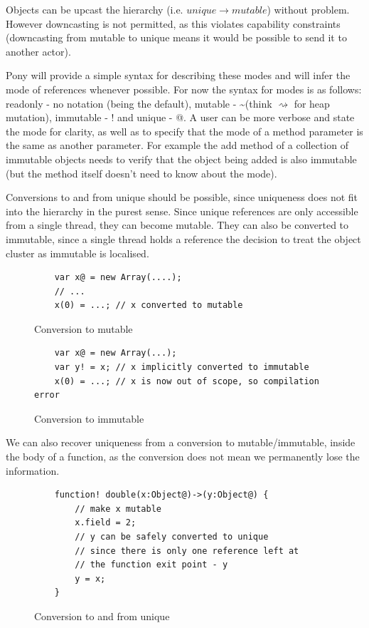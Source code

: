 \documentclass[pdftex,11pt,a4paper]{report}
\begin{document}
Objects can be upcast the hierarchy (i.e. $unique \to mutable$) without problem.
However downcasting is not permitted, as this violates capability constraints (downcasting from mutable to unique means it would be possible to send it to another actor).

Pony will provide a simple syntax for describing these modes and will infer the mode of references whenever possible.
For now the syntax for modes is as follows: readonly - no notation (being the default),  mutable - \textasciitilde (think $\rightsquigarrow$ for heap mutation), immutable - ! and unique - @.
A user can be more verbose and state the mode for clarity, as well as to specify that the mode of a method parameter is the same as another parameter.
For example the add method of a collection of immutable objects needs to verify that the object being added is also immutable (but the method itself doesn't need to know about the mode).

Conversions to and from unique should be possible, since uniqueness does not fit into the hierarchy in the purest sense.
Since unique references are only accessible from a single thread, they can become mutable.
They can also be converted to immutable, since a single thread holds a reference the decision to treat the object cluster as immutable is localised.

\begin{figure}[H]
\begin{verbatim}
    var x@ = new Array(....);
    // ...
    x(0) = ...; // x converted to mutable
\end{verbatim}
\caption{Conversion to mutable}
\end{figure}

\begin{figure}[H]
\begin{verbatim}
    var x@ = new Array(...);
    var y! = x; // x implicitly converted to immutable
    x(0) = ...; // x is now out of scope, so compilation error
\end{verbatim}
\caption{Conversion to immutable}
\end{figure}

We can also recover uniqueness from a conversion to mutable/immutable, inside the body of a function, as the conversion does not mean we permanently lose the information.

\begin{figure}[H]
\begin{verbatim}
    function! double(x:Object@)->(y:Object@) {
        // make x mutable
        x.field = 2;
        // y can be safely converted to unique
        // since there is only one reference left at
        // the function exit point - y
        y = x;
    }
\end{verbatim}
\caption{Conversion to and from unique}
\end{figure}
\end{document}
